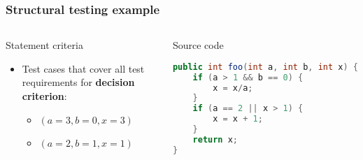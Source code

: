 \begin{frame}[hasprev=true, hasnext=false, fragile]
\frametitle{Structural testing example}

\begin{columns}[t]
\begin{block}{Statement criteria}
\begin{itemize}
	\item Test cases that cover all test requirements for \textbf{decision
	criterion}:
	\begin{itemize}
		\item $(a = 3, b = 0, x = 3)$
		\item $(a = 2, b = 1, x = 1)$
	\end{itemize}
\end{itemize}
\end{block}
\begin{block}{Source code}
\begin{lstlisting}[language=java]
public int foo(int a, int b, int x) {
	if (a > 1 && b == 0) {
		x = x/a;
	}
	if (a == 2 || x > 1) {
		x = x + 1;
	}
	return x;
}
\end{lstlisting}
\end{block}
\end{columns}
\end{frame}

